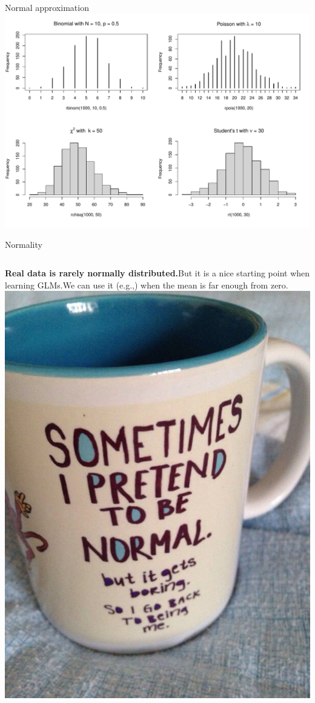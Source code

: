 \documentclass[
  ignorenonframetext,
]{beamer}
\newcommand{\columnsbegin}{\begin{columns}}
\newcommand{\columnsend}{\end{columns}}
\begin{document}
\begin{frame}{Normal approximation}
\label{normal-approximation}
\includegraphics{IntroLM_files/figure-beamer/unnamed-chunk-5-1.pdf}
\end{frame}

\begin{frame}{Normality}
\label{normality}
\columnsbegin
{}

\textbf{Real data is rarely normally distributed.}\newline But it is a
nice starting point when learning GLMs.\newline We can use it (e.g.,)
when the mean is far enough from zero.  \centering
\includegraphics{normal.jpeg} \columnsend
\end{frame}
\end{document}
